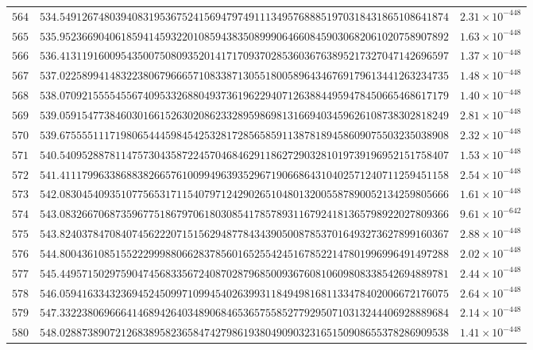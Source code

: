 \documentclass[12pt,reqno]{amsart}
\theoremstyle{remark}
\begin{document}
\begin{longtable}{clc}
$564$ & $534.5491267480394083195367524156947974911134957688851970318431865108641874$ & $2.31\times 10^{-448}$ \\
$565$ & $535.9523669040618594145932201085943835089990646608459030682061020758907892$ & $1.63\times 10^{-448}$ \\
$566$ & $536.4131191600954350075080935201417170937028536036763895217327047142696597$ & $1.37\times 10^{-448}$ \\
$567$ & $537.0225899414832238067966657108338713055180058964346769179613441263234735$ & $1.48\times 10^{-448}$ \\
$568$ & $538.0709215555455674095332688049373619622940712638844959478450665468617179$ & $1.40\times 10^{-448}$ \\
$569$ & $539.0591547738460301661526302086233289598698131669403459626108738302818249$ & $2.81\times 10^{-448}$ \\
$570$ & $539.6755551117198065444598454253281728565859113878189458609075503235038908$ & $2.32\times 10^{-448}$ \\
$571$ & $540.5409528878114757304358722457046846291186272903281019739196952151758407$ & $1.53\times 10^{-448}$ \\
$572$ & $541.4111799633868838266576100994963935296719066864310402571240711259451158$ & $2.54\times 10^{-448}$ \\
$573$ & $542.0830454093510775653171154079712429026510480132005587890052134259805666$ & $1.61\times 10^{-448}$ \\
$574$ & $543.0832667068735967751867970618030854178578931167924181365798922027809366$ & $9.61\times 10^{-642}$ \\
$575$ & $543.8240378470840745622207151562948778434390500878537016493273627899160367$ & $2.88\times 10^{-448}$ \\
$576$ & $544.8004361085155222999880662837856016525542451678522147801996996491497288$ & $2.02\times 10^{-448}$ \\
$577$ & $545.4495715029759047456833567240870287968500936760810609808338542694889781$ & $2.44\times 10^{-448}$ \\
$578$ & $546.0594163343236945245099710994540263993118494981681133478402006672176075$ & $2.64\times 10^{-448}$ \\
$579$ & $547.3322380696664146894264034890684653657558527792950710313244406928889684$ & $2.14\times 10^{-448}$ \\
$580$ & $548.0288738907212683895823658474279861938049090323165150908655378286909538$ & $1.41\times 10^{-448}$ \\

\end{longtable}
\end{document}
